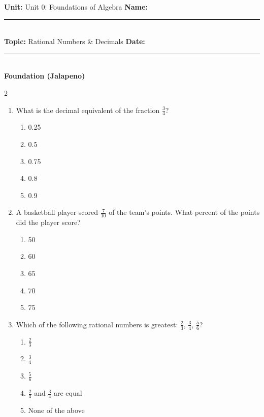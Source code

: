 \documentclass[10pt]{article}
\begin{document}
\enlargethispage{2.5cm}

\begin{tcolorbox}[colback=mainblue!5, colframe=mainblue, sharp corners, boxrule=0.5pt]
    \small \textbf{Unit:} Unit 0: Foundations of Algebra \hfill \textbf{Name:} \rule{3cm}{0.4pt} \\
    \small \textbf{Topic:} Rational Numbers & Decimals \hfill \textbf{Date:} \rule{2cm}{0.4pt} \\
    \centering \textbf{\large Foundation (Jalapeno)}
\end{tcolorbox}

\vspace{0.2cm}

\begin{multicols}{2}
\begin{enumerate}[label=\textbf{Q\arabic*.}, leftmargin=*, itemsep=6pt, parsep=0pt]

  \item \small What is the decimal equivalent of the fraction $\frac{3}{4}$?
  \begin{enumerate}[label=(\Alph*), leftmargin=0.6cm, nosep, itemsep=2pt]
    \item 0.25
    \item 0.5
    \item 0.75
    \item 0.8
    \item 0.9
  \end{enumerate}

  \item \small A basketball player scored $\frac{7}{10}$ of the team's points. What percent of the points did the player score?
  \begin{enumerate}[label=(\Alph*), leftmargin=0.6cm, nosep, itemsep=2pt]
    \item 50%
    \item 60%
    \item 65%
    \item 70%
    \item 75%
  \end{enumerate}

  \item \small Which of the following rational numbers is greatest: $\frac{2}{3}$, $\frac{3}{4}$, $\frac{5}{6}$?
  \begin{enumerate}[label=(\Alph*), leftmargin=0.6cm, nosep, itemsep=2pt]
    \item $\frac{2}{3}$
    \item $\frac{3}{4}$
    \item $\frac{5}{6}$
    \item $\frac{2}{3}$ and $\frac{3}{4}$ are equal
    \item None of the above
  \end{enumerate}


\end{enumerate}
\end{multicols}
\end{document}
